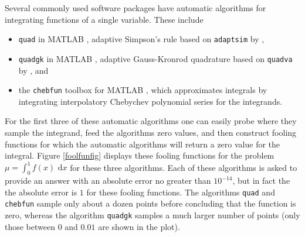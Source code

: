 \documentclass[graybox]{svmult}
\newcommand{\rd}{\,\mathrm{d}}
\newcommand{\dif}{\rd}
\begin{document}
Several commonly used software packages have automatic algorithms for integrating functions of a single variable.  These include 
\begin{itemize} 

\item {\tt quad} in MATLAB \citep{MAT7.12}, adaptive Simpson's rule based on {\tt adaptsim} by \cite{GanGau00a},

\item {\tt quadgk} in MATLAB \citep{MAT7.12}, adaptive Gauss-Kronrod quadrature based on {\tt quadva} by \cite{Sha08a}, and

\item the {\tt chebfun} \citep{TrefEtal12} toolbox for MATLAB \citep{MAT7.12}, which approximates integrals by integrating interpolatory Chebychev polynomial series for the integrands.


\end{itemize}

For the first three of these automatic algorithms one can easily probe where they sample the integrand, feed the algorithms zero values, and then construct fooling functions for which the automatic algorithms will return a zero value for the integral.  Figure \ref{foolfunfig} displays these fooling functions for the problem $\mu=\int_0^1 f(x) \, \dif x$ for these three algorithms. Each of these algorithms is asked to provide an answer with an absolute error no greater than $10^{-14}$, but in fact the the absolute error is $1$ for these fooling functions.  The algorithms {\tt quad} and {\tt chebfun} sample only about a dozen points before concluding that the function is zero, whereas the algorithm {\tt quadgk} samples a much larger number of points (only those between $0$ and $0.01$ are shown in the plot). 
\end{document}
